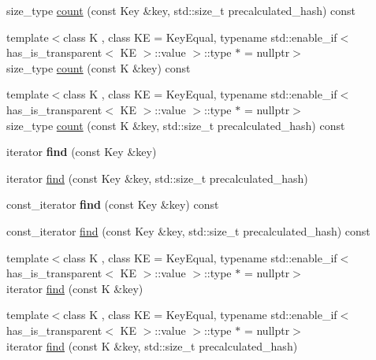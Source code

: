 \begin{DoxyCompactItemize}
size\+\_\+type \mbox{\hyperlink{classtsl_1_1robin__map_a26bcd048ce6a0217daca1293588dc3d1}{count}} (const Key \&key, std\+::size\+\_\+t precalculated\+\_\+hash) const
\item 
{\footnotesize template$<$class K , class KE  = Key\+Equal, typename std\+::enable\+\_\+if$<$ has\+\_\+is\+\_\+transparent$<$ K\+E $>$\+::value $>$\+::type $\ast$  = nullptr$>$ }\\size\+\_\+type \mbox{\hyperlink{classtsl_1_1robin__map_a2cbedaf29421535022d2bce6f703b67e}{count}} (const K \&key) const
\item 
{\footnotesize template$<$class K , class KE  = Key\+Equal, typename std\+::enable\+\_\+if$<$ has\+\_\+is\+\_\+transparent$<$ K\+E $>$\+::value $>$\+::type $\ast$  = nullptr$>$ }\\size\+\_\+type \mbox{\hyperlink{classtsl_1_1robin__map_ad62bf9929897b8147abaa0de8a62599a}{count}} (const K \&key, std\+::size\+\_\+t precalculated\+\_\+hash) const
\item 
\mbox{\label{classtsl_1_1robin__map_aad8cc88e86eb4fdce3aacc8b07362006}} 
iterator {\bfseries find} (const Key \&key)
\item 
iterator \mbox{\hyperlink{classtsl_1_1robin__map_a35021b11aabb61820236692a54b3a0f8}{find}} (const Key \&key, std\+::size\+\_\+t precalculated\+\_\+hash)
\item 
\mbox{\label{classtsl_1_1robin__map_a853ad699f8de5cef2ba467fba484d2e8}} 
const\+\_\+iterator {\bfseries find} (const Key \&key) const
\item 
const\+\_\+iterator \mbox{\hyperlink{classtsl_1_1robin__map_a332b9d3702e9f5b7ae356857a4c03e01}{find}} (const Key \&key, std\+::size\+\_\+t precalculated\+\_\+hash) const
\item 
{\footnotesize template$<$class K , class KE  = Key\+Equal, typename std\+::enable\+\_\+if$<$ has\+\_\+is\+\_\+transparent$<$ K\+E $>$\+::value $>$\+::type $\ast$  = nullptr$>$ }\\iterator \mbox{\hyperlink{classtsl_1_1robin__map_a7ace7db6d815c2b353d6cb590724ceb0}{find}} (const K \&key)
\item 
{\footnotesize template$<$class K , class KE  = Key\+Equal, typename std\+::enable\+\_\+if$<$ has\+\_\+is\+\_\+transparent$<$ K\+E $>$\+::value $>$\+::type $\ast$  = nullptr$>$ }\\iterator \mbox{\hyperlink{classtsl_1_1robin__map_aff06d18f3090fcd2cd3eeccbf25b5174}{find}} (const K \&key, std\+::size\+\_\+t precalculated\+\_\+hash)

\end{DoxyCompactItemize}
